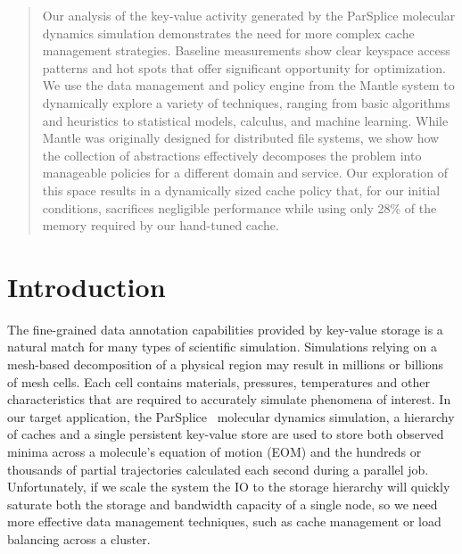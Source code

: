 \begin{abstract}

Our analysis of the key-value activity generated by the ParSplice molecular
dynamics simulation demonstrates the need for more complex cache management
strategies. Baseline measurements show clear keyspace access patterns and hot
spots that offer significant opportunity for optimization. We use the data
management and policy engine from the Mantle system to dynamically explore a
variety of techniques, ranging from basic algorithms and heuristics to
statistical models, calculus, and machine learning. While Mantle was originally
designed for distributed file systems, we show how the collection of
abstractions effectively decomposes the problem into manageable policies for a
different domain and service.  Our exploration of this space results in a
dynamically sized cache policy that, for our initial conditions, sacrifices
negligible performance while using only 28\% of the memory required by our
hand-tuned cache.

\end{abstract}

\section{Introduction}

The fine-grained data annotation capabilities provided by key-value storage is
a natural match for many types of scientific simulation. Simulations relying on
a mesh-based decomposition of a physical region may result in millions or
billions of mesh cells. Each cell contains materials, pressures, temperatures
and other characteristics that are required to accurately simulate phenomena of
interest. In our target application, the
ParSplice~\cite{perez:jctc20150parsplice} molecular dynamics simulation, a
hierarchy of caches and a single persistent key-value store are used to store
both observed minima across a molecule's equation of motion (EOM) and the
hundreds or thousands of partial trajectories calculated each second during a
parallel job. Unfortunately, if we scale the system the IO to the storage
hierarchy will quickly saturate both the storage and bandwidth capacity of a
single node, so we need more effective data management techniques, such as
cache management or load balancing across a cluster.


